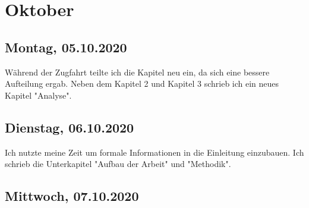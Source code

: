 \documentclass[../main.tex]{subfiles}
\begin{document}
	\section{Oktober}
	
	\subsection{Montag, 05.10.2020}
	Während der Zugfahrt teilte ich die Kapitel neu ein, da sich eine bessere Aufteilung ergab.
	Neben dem Kapitel 2 und Kapitel 3 schrieb ich ein neues Kapitel "Analyse".
	
	\subsection{Dienstag, 06.10.2020}
	Ich nutzte meine Zeit um formale Informationen in die Einleitung einzubauen.
	Ich schrieb die Unterkapitel "Aufbau der Arbeit" und "Methodik".
	
	\subsection{Mittwoch, 07.10.2020}
	
\end{document}
